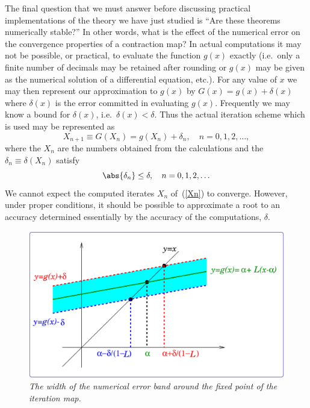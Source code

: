 The final question that we must answer before discussing practical
implementations of the theory we have just studied is ``Are these
theorems numerically stable?''  In other words, what is the effect of
the numerical error on the convergence properties of a contraction
map?  In actual computations it may not be possible, or practical, to
evaluate the function $g(x)$ exactly (i.e.\ only a finite number of
decimals may be retained after rounding or $g(x)$ may be given as the
numerical solution of a differential equation, etc.).  For any value
of $x$ we may then represent our approximation to $g(x)$ by $G(x) =
g(x) + \delta(x)$ where $\delta(x)$ is the error committed in
evaluating $g(x)$.  Frequently we may know a bound for $\delta(x)$,
i.e.\ $\delta(x) < \delta$.  Thus the actual iteration scheme which is
used may be represented as
%
\begin{equation}
  X_{n+1} \equiv G(X_n) = g(X_n) + \delta_n, \quad
  n = 0,1,2, \ldots, \label{Xn}
\end{equation}
%
where the $X_n$ are the numbers obtained from the calculations and the
$\delta_n \equiv \delta(X_n)$ satisfy
%
\begin{equation}
  \abs{\delta_n} \le \delta, \quad n= 0,1,2, \ldots \label{deltabound}
\end{equation}
%
We cannot expect the computed iterates $X_n$ of~(\ref{Xn}) to
converge.   However, under proper conditions, it should be possible to
approximate a root to an accuracy determined essentially by the
accuracy of the computations, $\delta$.

\begin{figure}
  \centerline{\includegraphics[width=120mm]{figures/contract_error}}
  \caption{\label{fig:contract_error} \it The width of the numerical
    error band around the fixed point of the iteration map.}
\end{figure}

